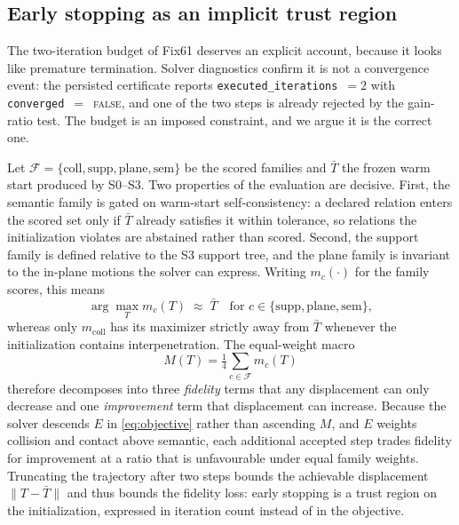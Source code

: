 \documentclass[10pt,twocolumn]{article}
\begin{document}
\subsection{Early stopping as an implicit trust region}
\label{sec:earlystop}

The two-iteration budget of Fix61 deserves an explicit account, because it
looks like premature termination.  Solver diagnostics confirm it is not a
convergence event: the persisted certificate reports
\texttt{executed\_iterations}~$=2$ with \texttt{converged}~$=$~\textsc{false},
and one of the two steps is already rejected by the gain-ratio test.  The
budget is an imposed constraint, and we argue it is the correct one.

Let $\mathcal{F}=\{\mathrm{coll},\mathrm{supp},\mathrm{plane},\mathrm{sem}\}$
be the scored families and $\bar T$ the frozen warm start produced by S0--S3.
Two properties of the evaluation are decisive.  First, the semantic family is
gated on warm-start self-consistency: a declared relation enters the scored set
only if $\bar T$ already satisfies it within tolerance, so relations the
initialization violates are abstained rather than scored.  Second, the support
family is defined relative to the S3 support tree, and the plane family is
invariant to the in-plane motions the solver can express.  Writing
$m_c(\cdot)$ for the family scores, this means
\begin{equation}
  \arg\max_{T} m_c(T)\;\approx\;\bar T
  \quad\text{for } c\in\{\mathrm{supp},\mathrm{plane},\mathrm{sem}\},
  \label{eq:anchored}
\end{equation}
whereas only $m_{\mathrm{coll}}$ has its maximizer strictly away from $\bar T$
whenever the initialization contains interpenetration.  The equal-weight macro
\begin{equation}
  M(T)=\tfrac14\!\!\sum_{c\in\mathcal{F}}\!\! m_c(T)
\end{equation}
therefore decomposes into three \emph{fidelity} terms that any displacement can
only decrease and one \emph{improvement} term that displacement can increase.
Because the solver descends $E$ in \eqref{eq:objective} rather than ascending
$M$, and $E$ weights collision and contact above semantic, each additional
accepted step trades fidelity for improvement at a ratio that is unfavourable
under equal family weights.  Truncating the trajectory after two steps bounds
the achievable displacement $\|T-\bar T\|$ and thus bounds the fidelity loss:
early stopping is a trust region on the initialization, expressed in iteration
count instead of in the objective.
\end{document}
